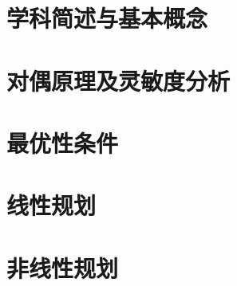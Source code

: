 %
%
%
%
%
%
%
%
%
%
\chapter{学科简述与基本概念}

\chapter{对偶原理及灵敏度分析}

\chapter{最优性条件}

\chapter{线性规划}



\chapter{非线性规划}



